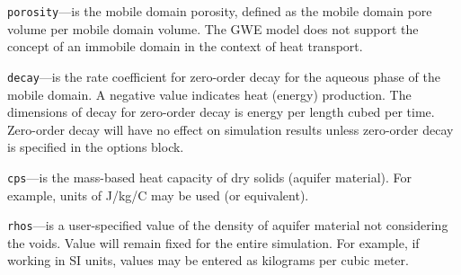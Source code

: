 \begin{description}
\item \texttt{porosity}---is the mobile domain porosity, defined as the mobile domain pore volume per mobile domain volume.  The GWE model does not support the concept of an immobile domain in the context of heat transport.

\item \texttt{decay}---is the rate coefficient for zero-order decay for the aqueous phase of the mobile domain.  A negative value indicates heat (energy) production.  The dimensions of decay for zero-order decay is energy per length cubed per time.  Zero-order decay will have no effect on simulation results unless zero-order decay is specified in the options block.

\item \texttt{cps}---is the mass-based heat capacity of dry solids (aquifer material). For example, units of J/kg/C may be used (or equivalent).

\item \texttt{rhos}---is a user-specified value of the density of aquifer material not considering the voids. Value will remain fixed for the entire simulation.  For example, if working in SI units, values may be entered as kilograms per cubic meter.

\end{description}

